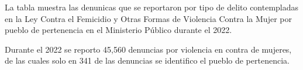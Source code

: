 La tabla muestra las denunicas que se reportaron por tipo de delito contempladas en la Ley Contra el Femicidio y Otras Formas de Violencia Contra la Mujer por pueblo de pertenencia en el Ministerio Público durante el 2022. 

Durante el 2022 se reporto 45,560 denuncias por violencia en contra de mujeres, de las cuales solo en 341 de las denuncias se identifico el pueblo de pertenencia.
